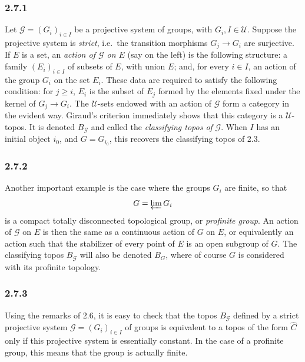 \documentclass[11pt]{article}
\newcommand{\U}{\mathcal{U}}
\newcommand{\G}{\mathcal{G}}
\newcommand{\ie}{i.e.}
\begin{document}
\subsubsection*{2.7.1}
Let \(\G=(G_i)_{i\in I}\) be a projective system of groups, with \(G_i,I\in\U\). Suppose the projective system is \emph{strict}, \ie\ the transition morphisms \(G_j\to G_i\) are surjective. If \(E\) is a set, an \emph{action of \(\G\) on \(E\)} (say on the left) is the following structure: a family \((E_i)_{i\in I}\) of subsets of \(E\), with union \(E\); and, for every \(i\in I\), an action of the group \(G_i\) on the set \(E_i\). These data are required to satisfy the following condition: for \(j\ge i\), \(E_i\) is the subset of \(E_j\) formed by the elements fixed under the kernel of \(G_j\to G_i\). The \(\U\)-sets endowed with an action of \(\G\) form a category in the evident way. Giraud's criterion immediately shows that this category is a \(\U\)-topos. It is denoted \(B_{\G}\) and called the \emph{classifying topos of} \(\G\). When \(I\) has an initial object \(i_0\), and \(G=G_{i_0}\), this recovers the classifying topos of 2.3.

\subsubsection*{2.7.2}
Another important example is the case where the groups \(G_i\) are finite, so that
\[
G=\varprojlim G_i
\]
is a compact totally disconnected topological group, or \emph{profinite group}. An action of \(\G\) on \(E\) is then the same as a continuous action of \(G\) on \(E\), or equivalently an action such that the stabilizer of every point of \(E\) is an open subgroup of \(G\). The classifying topos \(B_\G\) will also be denoted \(B_G\), where of course \(G\) is considered with its profinite topology.

\subsubsection*{2.7.3}
Using the remarks of 2.6, it is easy to check that the topos \(B_{\G}\) defined by a strict projective system \(\G=(G_i)_{i\in I}\) of groups is equivalent to a topos of the form \(\widehat C\) only if this projective system is essentially constant. In the case of a profinite group, this means that the group is actually finite.
\end{document}
